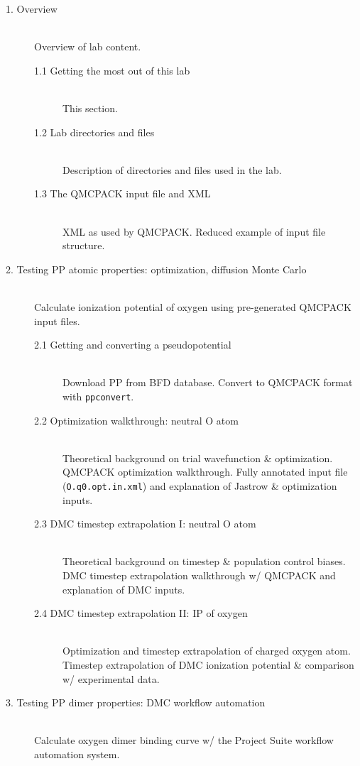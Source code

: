 \begin{description}
\item[1. Overview] \hfill \\
  Overview of lab content.
  \begin{description}
  \item[1.1 Getting the most out of this lab] \hfill \\
    This section.
  \item[1.2 Lab directories and files] \hfill \\
    Description of directories and files used in the lab.
  \item[1.3 The QMCPACK input file and XML] \hfill \\
    XML as used by QMCPACK.  Reduced example of input file structure. 
  \end{description}
\item[2. Testing PP atomic properties: optimization, diffusion Monte Carlo] \hfill \\
  Calculate ionization potential of oxygen using pre-generated QMCPACK input files.
  \begin{description}
  \item[2.1 Getting and converting a pseudopotential] \hfill \\
    Download PP from BFD database.  Convert to QMCPACK format with \texttt{ppconvert}. 
  \item[2.2 Optimization walkthrough: neutral O atom] \hfill \\
    Theoretical background on trial wavefunction \& optimization.  QMCPACK optimization walkthrough.  Fully annotated input file (\texttt{O.q0.opt.in.xml}) and explanation of Jastrow \& optimization inputs.
  \item[2.3 DMC timestep extrapolation I: neutral O atom] \hfill \\
    Theoretical background on timestep \& population control biases.  DMC timestep extrapolation walkthrough w/ QMCPACK and  explanation of DMC inputs.  
  \item[2.4 DMC timestep extrapolation II: IP of oxygen] \hfill \\
    Optimization and timestep extrapolation of charged oxygen atom.  Timestep extrapolation of DMC ionization potential \& comparison w/ experimental data.
  \end{description}
\item[3. Testing PP dimer properties: DMC workflow automation] \hfill \\
  Calculate oxygen dimer binding curve w/ the Project Suite workflow automation system.

\end{description}

